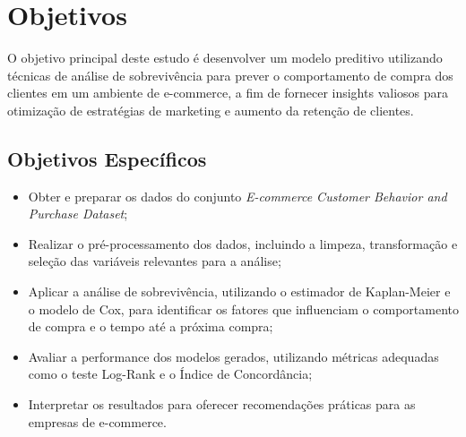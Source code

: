 \section{Objetivos}
O objetivo principal deste estudo é desenvolver um modelo preditivo utilizando técnicas de análise de sobrevivência para prever o comportamento de compra dos clientes em um ambiente de e-commerce, a fim de fornecer insights valiosos para otimização de estratégias de marketing e aumento da retenção de clientes.

\subsection{Objetivos Específicos}
\begin{itemize}
	\item Obter e preparar os dados do conjunto \textit{E-commerce Customer Behavior and Purchase Dataset};
	\item Realizar o pré-processamento dos dados, incluindo a limpeza, transformação e seleção das variáveis relevantes para a análise;
	\item Aplicar a análise de sobrevivência, utilizando o estimador de Kaplan-Meier e o modelo de Cox, para identificar os fatores que influenciam o comportamento de compra e o tempo até a próxima compra;
	\item Avaliar a performance dos modelos gerados, utilizando métricas adequadas como o teste Log-Rank e o Índice de Concordância;
	\item Interpretar os resultados para oferecer recomendações práticas para as empresas de e-commerce.
\end{itemize}
